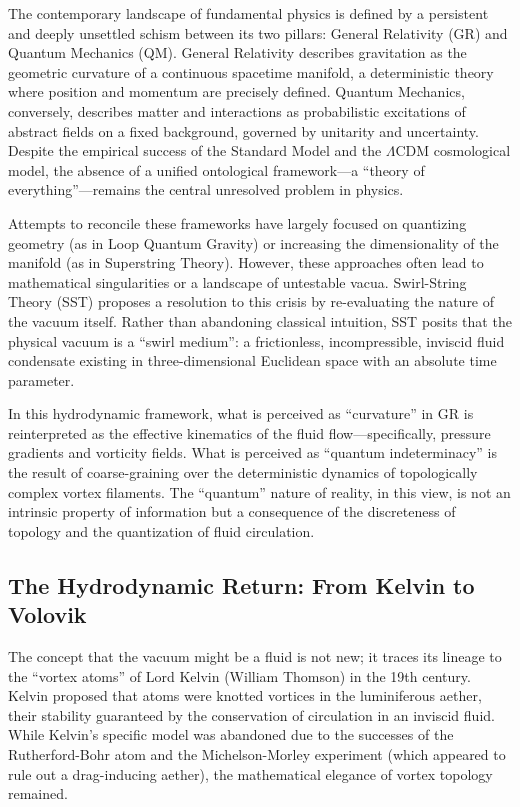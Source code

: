 \documentclass[11pt]{article}
\begin{document}
The contemporary landscape of fundamental physics is defined by a persistent and deeply unsettled schism between its two pillars: General Relativity (GR) and Quantum Mechanics (QM). General Relativity describes gravitation as the geometric curvature of a continuous spacetime manifold, a deterministic theory where position and momentum are precisely defined. Quantum Mechanics, conversely, describes matter and interactions as probabilistic excitations of abstract fields on a fixed background, governed by unitarity and uncertainty. Despite the empirical success of the Standard Model and the $\Lambda$CDM cosmological model, the absence of a unified ontological framework—a ``theory of everything''—remains the central unresolved problem in physics.

Attempts to reconcile these frameworks have largely focused on quantizing geometry (as in Loop Quantum Gravity) or increasing the dimensionality of the manifold (as in Superstring Theory). However, these approaches often lead to mathematical singularities or a landscape of untestable vacua. Swirl-String Theory (SST) proposes a resolution to this crisis by re-evaluating the nature of the vacuum itself. Rather than abandoning classical intuition, SST posits that the physical vacuum is a ``swirl medium'': a frictionless, incompressible, inviscid fluid condensate existing in three-dimensional Euclidean space with an absolute time parameter.

In this hydrodynamic framework, what is perceived as ``curvature'' in GR is reinterpreted as the effective kinematics of the fluid flow---specifically, pressure gradients and vorticity fields. What is perceived as ``quantum indeterminacy'' is the result of coarse-graining over the deterministic dynamics of topologically complex vortex filaments. The ``quantum'' nature of reality, in this view, is not an intrinsic property of information but a consequence of the discreteness of topology and the quantization of fluid circulation.

\subsection*{The Hydrodynamic Return: From Kelvin to Volovik}

The concept that the vacuum might be a fluid is not new; it traces its lineage to the ``vortex atoms'' of Lord Kelvin (William Thomson) in the 19th century. Kelvin proposed that atoms were knotted vortices in the luminiferous aether, their stability guaranteed by the conservation of circulation in an inviscid fluid. While Kelvin's specific model was abandoned due to the successes of the Rutherford-Bohr atom and the Michelson-Morley experiment (which appeared to rule out a drag-inducing aether), the mathematical elegance of vortex topology remained.
\end{document}
